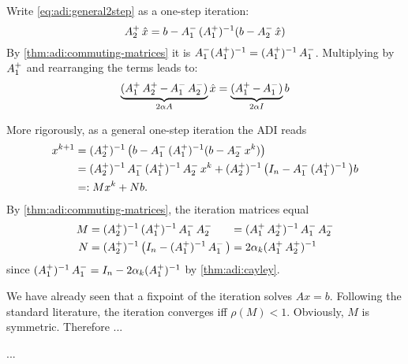Write \eqref{eq:adi:general2step} as a one-step iteration:
\begin{equation*}
  \mathop{A_2^+} \hat x = b - \mathop{A_1^-} \mathop{(\mathop{A_1^+})^{-1}} (b - \mathop{A_2^-} \hat x)
\end{equation*}
By \autoref{thm:adi:commuting-matrices} it is $\mathop{A_1^-} (\mathop{A_1^+})^{-1} = (\mathop{A_1^+})^{-1} \mathop{A_1^-}$.
Multiplying by $\mathop{A_1^+}$ and rearranging the terms leads to:
\begin{equation*}
  \underbrace{%
  (\Aip \Aiip - \Aim \Aiim)
  }_{2\alpha A}
  \hat x =
  \underbrace{%
  (\Aip - \Aim)
  }_{2\alpha I}
  b
\end{equation*}

More rigorously, as a general one-step iteration the \ac{ADI} reads
\begin{equation}
\begin{aligned}
  x^{k+1}
  &= \mathop{(\mathop{A_2^+})^{-1}} \big( b - \mathop{A_1^-} \mathop{(\mathop{A_1^+})^{-1}} (b - \mathop{A_2^-} x^k) \big) \\
  &= \mathop{(\mathop{A_2^+})^{-1}} \mathop{A_1^-} \mathop{(\mathop{A_1^+})^{-1}} \mathop{A_2^-} x^k + \mathop{(\mathop{A_2^+})^{-1}} \big( I_n - \mathop{A_1^-} \mathop{(\mathop{A_1^+})^{-1}} \big) b \\
  &=: Mx^k + Nb
  .
\end{aligned}
\end{equation}
By \autoref{thm:adi:commuting-matrices}, the iteration matrices equal
\begin{equation}
\label{eq:adi:general1step}
  \begin{alignedat}{2}
    M
    &= \mathop{(\mathop{A_2^+})^{-1}} \mathop{(\mathop{A_1^+})^{-1}} \mathop{A_1^-} \mathop{A_2^-}
    &&= (\mathop{A_1^+}\mathop{A_2^+})^{-1} \mathop{A_1^-}\mathop{A_2^-}
    \\
    N
    &= \mathop{(\mathop{A_2^+})^{-1}} \big( I_n - \mathop{(\mathop{A_1^+})^{-1}} \mathop{A_1^-} \big)
    &&= 2\alpha_k (\mathop{A_1^+}\mathop{A_2^+})^{-1}
  \end{alignedat}
\end{equation}
since $\mathop{(\mathop{A_1^+})^{-1}} \mathop{A_1^-} = I_n - 2\alpha_k (\mathop{A_1^+})^{-1}$ by \autoref{thm:adi:cayley}.

We have already seen that a fixpoint of the iteration solves $Ax=b$.
Following the standard literature,
the iteration converges iff $\rho(M) < 1$.
Obviously, $M$ is symmetric.
Therefore ...


\begin{definition}
  ...
\end{definition}


